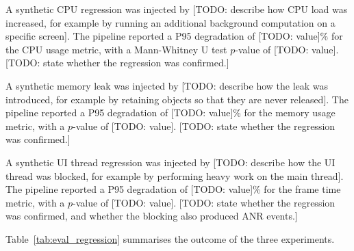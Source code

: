 A synthetic CPU regression was injected by [TODO: describe how CPU load was increased, for example by running an additional background computation on a specific screen]. The pipeline reported a P95 degradation of [TODO: value]\% for the CPU usage metric, with a Mann-Whitney U test $p$-value of [TODO: value]. [TODO: state whether the regression was confirmed.]

A synthetic memory leak was injected by [TODO: describe how the leak was introduced, for example by retaining objects so that they are never released]. The pipeline reported a P95 degradation of [TODO: value]\% for the memory usage metric, with a $p$-value of [TODO: value]. [TODO: state whether the regression was confirmed.]

A synthetic UI thread regression was injected by [TODO: describe how the UI thread was blocked, for example by performing heavy work on the main thread]. The pipeline reported a P95 degradation of [TODO: value]\% for the frame time metric, with a $p$-value of [TODO: value]. [TODO: state whether the regression was confirmed, and whether the blocking also produced ANR events.]

Table~\ref{tab:eval_regression} summarises the outcome of the three experiments.



